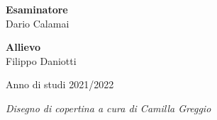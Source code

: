 \documentclass[class=book, crop=false, oneside, a4paper]{standalone}
\begin{document}
\begin{titlepage}
        \Large
        \textbf{Esaminatore}
        \vspace{0.125cm}\\
        \large
        Dario Calamai
        
        \raggedleft
        
        \Large
        \textbf{Allievo}
        \vspace{0.125cm}\\
        \large
        Filippo Daniotti
        
        
        
        \begin{center}
            \vspace{1cm}
            Anno di studi 2021/2022 
        \end{center}
        
    \end{titlepage}
    \clearpage

    \thispagestyle{empty}
    \vspace*{\fill}
    \begin{center}
        \textit{Disegno di copertina a cura di Camilla Greggio}
    \end{center}
    \clearpage
\end{document}
